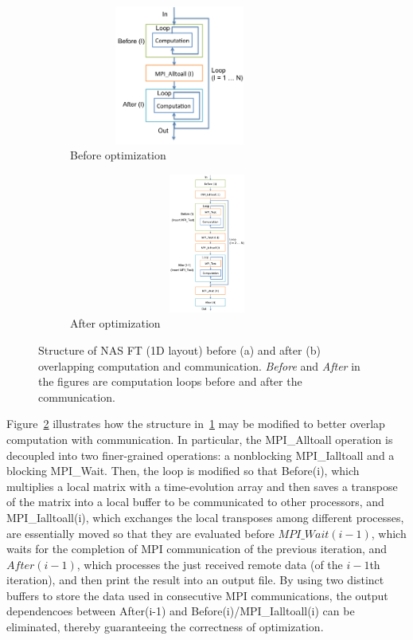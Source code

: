 \begin{figure}
  \centering
  \begin{subfigure}[b]{0.2\textwidth}
    \includegraphics[width=0.8\textwidth,height=1.8in]{fig/ft_loop.png}
    \caption{Before optimization}
    \label{fig:ft_loop}
  \end{subfigure}%
  \hspace{-.3in}
  \begin{subfigure}[b]{0.3\textwidth}
    \includegraphics[width=1.1\textwidth,height=1.8in]{fig/ft_cco.png}
    \caption{After optimization}
    \label{fig:ft_cco}
  \end{subfigure}
  \caption{Structure of NAS FT (1D layout) before (a) and after (b)
    overlapping computation and communication.  \emph{Before} and
    \emph{After} in the figures are computation loops before and after
    the communication.}
\label{fig:ft}
\end{figure}

Figure~\ref{fig:ft_cco} illustrates how the structure
in~\ref{fig:ft_loop} may be modified to better overlap computation
with communication.  In particular, the MPI\_Alltoall operation is
decoupled into two finer-grained operations: a nonblocking
MPI\_Ialltoall and a blocking MPI\_Wait.  Then, the loop is modified
so that Before(i), which multiplies a local matrix with a
time-evolution array and then saves a transpose of the matrix into a
local buffer to be communicated to other processors, and
MPI\_Ialltoall(i), which exchanges the local transposes among different
processes, are essentially moved so that they are evaluated before
$MPI\_Wait(i-1)$, which waits for the completion of MPI communication
of the previous iteration, and $After(i-1)$, which processes the just
received remote data (of the $i-1$th iteration), and then print the
result into an output file.  By using two distinct buffers to store
the data used in consecutive MPI communications, the output
dependencoes between After(i-1) and Before(i)/MPI\_Ialltoall(i) can be
eliminated, thereby guaranteeing the correctness of optimization.

